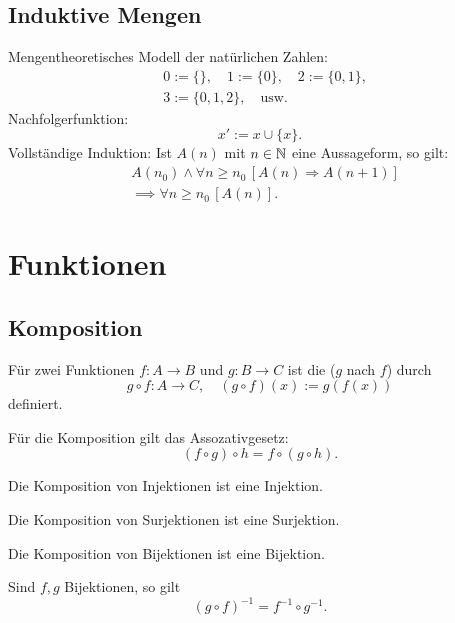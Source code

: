 \subsection{Induktive Mengen}
Mengentheoretisches Modell der natürlichen Zahlen:
\begin{equation}
\begin{split}
& 0:=\{\},\quad 1:=\{0\},\quad 2:=\{0,1\},\\
& 3:=\{0,1,2\},\quad \text{usw.}
\end{split}
\end{equation}
Nachfolgerfunktion:
\begin{equation}
x' := x\cup\{x\}.
\end{equation}
Vollständige Induktion: Ist $A(n)$ mit $n\in\mathbb N$
eine Aussageform, so gilt:
\begin{equation}
\begin{split}
& A(n_0)\land \forall n\ge n_0\,[A(n)\Rightarrow A(n+1)]\\
& \implies \forall n\ge n_0\,[A(n)].
\end{split}
\end{equation}

\section{Funktionen}
\subsection{Komposition}
\begin{Definition} Für zwei Funktionen $f\colon A\to B$
und $g\colon B\to C$ ist die  ($g$ nach $f$)
durch
\begin{equation}
g\circ f\colon A\to C,\quad (g\circ f)(x) := g(f(x))
\end{equation}
definiert.
\end{Definition}
Für die Komposition gilt das Assozativgesetz:
\begin{equation}
(f\circ g)\circ h = f\circ(g\circ h).
\end{equation}

Die Komposition von Injektionen ist eine Injektion.

Die Komposition von Surjektionen ist eine Surjektion.

Die Komposition von Bijektionen ist eine Bijektion.

Sind $f,g$ Bijektionen, so gilt
\begin{equation}
(g\circ f)^{-1} = f^{-1}\circ g^{-1}.
\end{equation}


